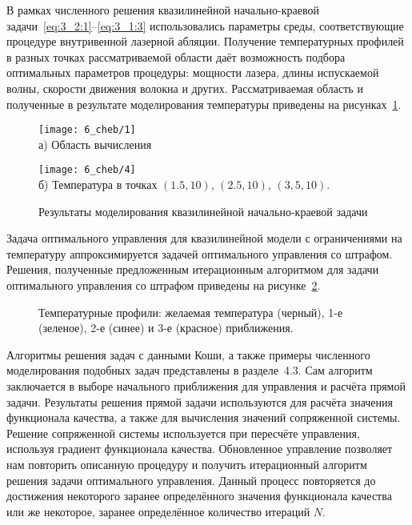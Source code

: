 В рамках численного решения квазилинейной начально-краевой задачи~\eqref{eq:3_2:1}--\eqref{eq:3_1:3}
использовались параметры среды, соответствующие процедуре внутривенной лазерной абляции.
Получение температурных профилей в разных точках рассматриваемой области
даёт возможность подбора оптимальных параметров процедуры: мощности лазера,
длины испускаемой волны, скорости движения волокна и других.
Рассматриваемая область и полученные в результате моделирования температуры
приведены на рисунках~\ref{fig:4_3:3}.
\begin{figure}[h!t]
    \begin{minipage}[b][][b]{0.49\linewidth}
        \centering
        \texttt{[image: 6\_cheb/1]}
        \\ а) Область вычисления
    \end{minipage}
    \hfill
    \begin{minipage}[b][][b]{0.49\linewidth}
        \centering
        \texttt{[image: 6\_cheb/4]}
        \\ б) Температура в точках $(1.5,10)$, $(2.5,10)$, $(3,5,10)$.
    \end{minipage}
    \caption{Результаты моделирования квазилинейной начально-краевой задачи}
    \label{fig:4_3:3}
\end{figure}


Задача оптимального управления для квазилинейной модели с ограничениями на
температуру аппроксимируется задачей оптимального управления со штрафом.
Решения, полученные предложенным итерационным алгоритмом для задачи оптимального управления
со штрафом приведены на рисунке~\ref{fig:4_3:7}.
\begin{figure}[h!t]
    \caption{Температурные профили: желаемая температура (черный),
        1-е (зеленое), 2-е (синее) и 3-е (красное) приближения.}
    \label{fig:4_3:7}
\end{figure}


Алгоритмы решения задач с данными Коши, а также примеры численного
моделирования подобных задач представлены в разделе~4.3.
Сам алгоритм заключается в выборе начального приближения для управления и расчёта прямой задачи.
Результаты решения прямой задачи используются для расчёта значения функционала качества,
а также для вычисления значений сопряженной системы.
Решение сопряженной системы используется при пересчёте управления,
используя градиент функционала качества.
Обновленное управление позволяет нам повторить описанную процедуру и получить итерационный
алгоритм решения задачи оптимального управления.
Данный процесс повторяется до достижения некоторого заранее определённого значения функционала
качества или же некоторое, заранее определённое количество итераций $N$.


